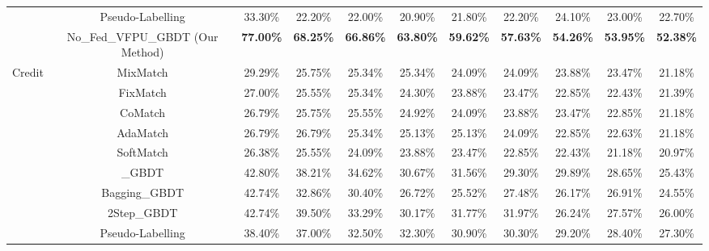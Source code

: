 \begin{table}[h]
{{\begin{tabular}{ccccccccccc}
				& Pseudo-Labelling                 & 33.30\%          & 22.20\%          & 22.00\%          & 20.90\%          & 21.80\%          & 22.20\%          & 24.10\%          & 23.00\%          & 22.70\%           \\
				& No\_Fed\_VFPU\_GBDT (Our Method) & \textbf{77.00\%} & \textbf{68.25\%} & \textbf{66.86\%} & \textbf{63.80\%} & \textbf{59.62\%} & \textbf{57.63\%} & \textbf{54.26\%} & \textbf{53.95\%} & \textbf{52.38\%}  \\ 
				\hline
				\multirow{10}{*}{Credit} & MixMatch                         & 29.29\%          & 25.75\%          & 25.34\%          & 25.34\%          & 24.09\%          & 24.09\%          & 23.88\%          & 23.47\%          & 21.18\%           \\
				& FixMatch                         & 27.00\%          & 25.55\%          & 25.34\%          & 24.30\%          & 23.88\%          & 23.47\%          & 22.85\%          & 22.43\%          & 21.39\%           \\
				& CoMatch                          & 26.79\%          & 25.75\%          & 25.55\%          & 24.92\%          & 24.09\%          & 23.88\%          & 23.47\%          & 22.85\%          & 21.18\%           \\
				& AdaMatch                         & 26.79\%          & 26.79\%          & 25.34\%          & 25.13\%          & 25.13\%          & 24.09\%          & 22.85\%          & 22.63\%          & 21.18\%           \\
				& SoftMatch                        & 26.38\%          & 25.55\%          & 24.09\%          & 23.88\%          & 23.47\%          & 22.85\%          & 22.43\%          & 21.18\%          & 20.97\%           \\
				& \_GBDT                           & 42.80\%          & 38.21\%          & 34.62\%          & 30.67\%          & 31.56\%          & 29.30\%          & 29.89\%          & 28.65\%          & 25.43\%           \\
				& Bagging\_GBDT                    & 42.74\%          & 32.86\%          & 30.40\%          & 26.72\%          & 25.52\%          & 27.48\%          & 26.17\%          & 26.91\%          & 24.55\%           \\
				& 2Step\_GBDT                      & 42.74\%          & 39.50\%          & 33.29\%          & 30.17\%          & 31.77\%          & 31.97\%          & 26.24\%          & 27.57\%          & 26.00\%           \\
				& Pseudo-Labelling                 & 38.40\%          & 37.00\%          & 32.50\%          & 32.30\%          & 30.90\%          & 30.30\%          & 29.20\%          & 28.40\%          & 27.30\%           \\

\end{tabular}}}
\end{table}
